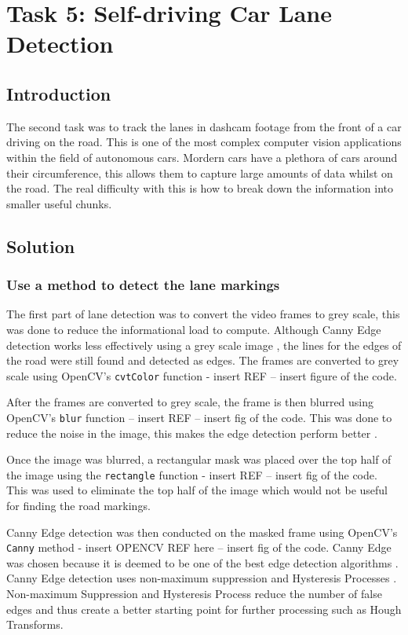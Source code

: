 \documentclass[conference]{IEEEtran}
\begin{document}
\section{Task 5: Self-driving Car Lane Detection}
\subsection{Introduction}

The second task was to track the lanes in dashcam footage from the front of a car driving on the road. This is one of the most complex computer vision applications within the field of autonomous cars. Mordern cars have a plethora of cars around their circumference, this allows them to capture large amounts of data whilst on the road. The real difficulty with this is how to break down the information into smaller useful chunks.  

\subsection{Solution}

\subsubsection{Use a method to detect the lane markings}

The first part of lane detection was to convert the video frames to grey scale, this was done to reduce the informational load to compute. Although Canny Edge detection works less effectively using a grey scale image \cite{Canny_On_Grey}, the lines for the edges of the road were still found and detected as edges. The frames are converted to grey scale using OpenCV's \verb|cvtColor| function - insert REF -- insert figure of the code.

After the frames are converted to grey scale, the frame is then blurred using OpenCV's \verb|blur| function -- insert REF -- insert fig of the code. This was done to reduce the noise in the image, this makes the edge detection perform better \cite{Image_Blurring}. 

Once the  image was blurred, a rectangular mask was placed over the top half of the image using the \verb|rectangle| function - insert REF -- insert fig of the code. This was used to eliminate the top half of the image which would not be useful for finding the road markings. 
 
Canny Edge detection was then conducted on the masked frame using OpenCV's \verb|Canny| method - insert OPENCV REF here -- insert fig of the code. Canny Edge was chosen because it is deemed to be one of the best edge detection algorithms \cite{Canny2009CannyED}. Canny Edge detection uses non-maximum suppression \cite{non-maximum_supression} and Hysteresis Processes \cite{Hysteresis_Thresholding}. Non-maximum Suppression and Hysteresis Process reduce the number of false edges and thus create a better starting point for further processing such as Hough Transforms. 
\end{document}
